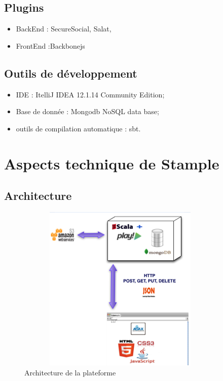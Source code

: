 \documentclass[11pt]{article} %
\begin{document}
\subsection{Plugins}
\begin{itemize}

\item BackEnd : SecureSocial, Salat,
\item FrontEnd :Backbonejs 

\end{itemize}
\subsection{Outils de développement}
\begin{itemize}
\item IDE : ItelliJ IDEA 12.1.14 Community Edition;
\item Base de donnée : Mongodb NoSQL data base;
\item outils de compilation automatique : sbt.
\end{itemize}
\section{Aspects technique de Stample}
\subsection{Architecture}
\begin{figure}[H]
        \centering
                \centering
                \includegraphics[width=10cm,height=8cm]{architectureStample.png}
                \caption{Architecture de la plateforme}
                \label{fig:Architecture de la plateforme}
       
\end{figure}
\end{document}
